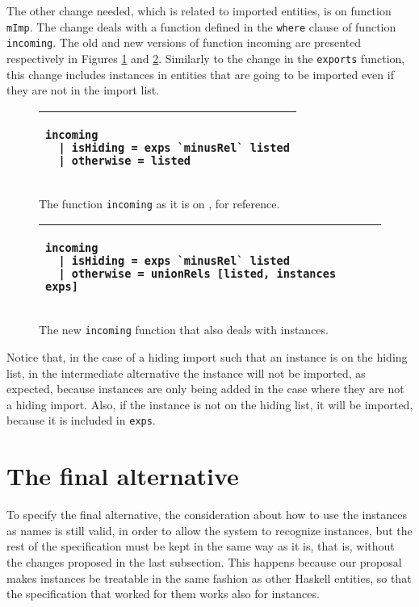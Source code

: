 \documentclass[msc]{ppgccufmg}
\begin{document}
The other change needed, which is related to imported entities, is on
function \texttt{mImp}.  The change deals with a function defined in
the \texttt{where} clause of function \texttt{incoming}.  The old and
new versions of function incoming are presented respectively in
Figures \ref{old-incoming} and \ref{new-incoming}.  Similarly to the
change in the \texttt{exports} function, this change includes
instances in entities that are going to be imported even if they are
not in the import list.

\begin{figure}
\caption{The function \texttt{incoming} as it is on \citep[section
    5.3]{formal}, for reference.\label{old-incoming}}
\begin{tabular}{|p{\textwidth}|}
\hline
\begin{verbatim}
incoming
  | isHiding = exps `minusRel` listed
  | otherwise = listed
\end{verbatim}
\\
\hline
\end{tabular}
\end{figure}

\begin{figure}
\caption{The new \texttt{incoming} function that also deals with
  instances.\label{new-incoming}}
\begin{tabular}{|p{\textwidth}|}
\hline
\begin{verbatim}
incoming
  | isHiding = exps `minusRel` listed
  | otherwise = unionRels [listed, instances exps]
\end{verbatim}
\\
\hline
\end{tabular}
\end{figure}

Notice that, in the case of a hiding import such that an instance is
on the hiding list, in the intermediate alternative the instance will
not be imported, as expected, because instances are only being added
in the case where they are not a hiding import.  Also, if the instance
is not on the hiding list, it will be imported, because it is included
in \texttt{exps}.

\section{The final alternative}
To specify the final alternative, the consideration about how to use the
instances as names is still valid, in order to allow the system to recognize
instances, but the
rest of the specification must be kept in the same way as it is, that is, without
the changes proposed in the last subsection.  This happens because our proposal
makes instances be treatable in the same fashion as other Haskell entities, so
that the specification that worked for them works also for instances.
\end{document}
